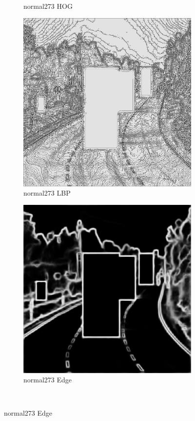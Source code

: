 \documentclass[a4paper, 10pt]{article}
\begin{document}
\begin{figure}[htbp]
\begin{subfigure}{0.24\textwidth}
			\caption*{normal273 HOG}
			\label{fig: normal273 HOG}
		\end{subfigure}	
		\begin{subfigure}{0.24\textwidth}
			\includegraphics[width=\linewidth]{picture/alldata_filled_lbp/normal273}
			\caption*{normal273 LBP}
			\label{fig: normal273 LBP}
		\end{subfigure}
		\begin{subfigure}{0.24\textwidth}
			\includegraphics[width=\linewidth]{picture/alldata_filled_edge/normal273}
			\caption*{normal273 Edge}
			\label{fig: normal273 Edge}
		\end{subfigure} \\
		

\end{figure}
\end{document}

